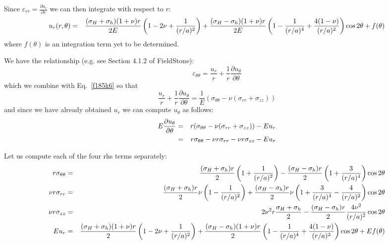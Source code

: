 \noindent Since $\varepsilon_{rr}  = \frac{\partial u_r}{\partial r} $ we 
can then integrate with respect to $r$:
\begin{eqnarray}
u_r(r,\theta)
&=& 
\frac{(\sigma_H+\sigma_h)(1+\nu)r}{2 E} \left(  1 -2\nu +\frac{1}{(r/a)^2} \right)   
+ \frac{(\sigma_H-\sigma_h)(1+\nu)r}{2E}
\left(  1 - \frac{1}{(r/a)^4} + \frac{4(1-\nu)}{(r/a)^2}  
\right) \cos 2\theta +f(\theta)\nonumber
\end{eqnarray}
where $f(\theta)$ is an integration term yet to be determined.

We have the relationship (e.g. see Section 4.1.2 of FieldStone):
\[
\varepsilon_{\theta\theta} 
= \frac{u_r}{r} + \frac{1}{r} \frac{\partial u_\theta}{\partial \theta}
\]
which we combine with Eq.~\eqref{f185k6} so that
\[
\frac{u_r}{r} + \frac{1}{r} \frac{\partial u_\theta}{\partial \theta}
= \frac{1}{E} (\sigma_{\theta\theta}-\nu (\sigma_{rr}+\sigma_{zz}))
\]
and since we have already obtained $u_r$ we can compute $u_{\theta}$ as follows:
\begin{eqnarray}
E \frac{\partial u_\theta}{\partial \theta}
&=& r (\sigma_{\theta\theta}-\nu (\sigma_{rr}+\sigma_{zz}))- E u_r 
\nonumber\\
&=& r\sigma_{\theta\theta}
-\nu r\sigma_{rr}
-\nu r\sigma_{zz}
- E u_r \nonumber
\end{eqnarray}

Let us compute each of the four rhs terms separately:
\begin{eqnarray}
r\sigma_{\theta\theta}&=& 
\frac{(\sigma_H+\sigma_h)r}{2} \left(1+\frac{1}{(r/a)^2} \right)
-\frac{(\sigma_H-\sigma_h)r}{2} \left( 1 + \frac{3}{(r/a)^4}   \right) \cos 2\theta   
\nonumber\\
\nu r\sigma_{rr} &=& 
\frac{(\sigma_H+\sigma_h) r}{2} \nu\left(1-\frac{1}{(r/a)^2} \right)
+\frac{(\sigma_H-\sigma_h)r }{2}  \nu\left( 1 + \frac{3}{(r/a)^4} - \frac{4}{(r/a)^2}   \right) \cos 2\theta   
\nonumber\\
\nu r \sigma_{zz} 
&=& 2\nu^2 r  \frac{\sigma_H+\sigma_h}{2} - \frac{(\sigma_H-\sigma_h)r}{2} \frac{4 \nu^2  }{(r/a)^2}  \cos 2\theta  
\nonumber\\
E u_r
&=& 
\frac{(\sigma_H+\sigma_h)(1+\nu)r}{2 } \left(  1 -2\nu +\frac{1}{(r/a)^2} \right)   
+ \frac{(\sigma_H-\sigma_h)(1+\nu)r}{2}
\left(  1 - \frac{1}{(r/a)^4} + \frac{4(1-\nu)}{(r/a)^2}  
\right) \cos 2\theta + E f(\theta)\nonumber
\end{eqnarray}

